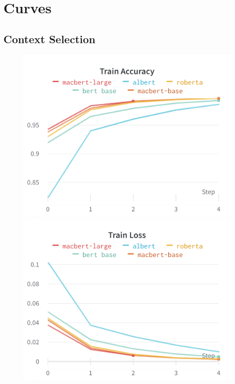 \documentclass{homeworg}
\begin{document}
\section{Curves}
\subsection{Context Selection}
\begin{figure}[!htb]
\includegraphics[width=\linewidth]{charts/Section-7-Panel-0-2whhfdmbm}
\endminipage\hfill
{}
\includegraphics[width=\linewidth]{charts/Section-7-Panel-1-f1x11cdy7}
\endminipage
\end{figure}
\end{document}
